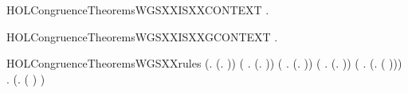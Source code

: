 \newcommand{\HOLCongruenceTheoremsWGSXXind}{\UseVerbatim{HOLCongruenceTheoremsWGSXXind}}
\begin{SaveVerbatim}{HOLCongruenceTheoremsWGSXXISXXCONTEXT}
\HOLTokenTurnstile{} \HOLSymConst{\HOLTokenForall{}}.   \HOLSymConst{\HOLTokenImp{}}  
\end{SaveVerbatim}
\newcommand{\HOLCongruenceTheoremsWGSXXISXXCONTEXT}{\UseVerbatim{HOLCongruenceTheoremsWGSXXISXXCONTEXT}}
\begin{SaveVerbatim}{HOLCongruenceTheoremsWGSXXISXXGCONTEXT}
\HOLTokenTurnstile{} \HOLSymConst{\HOLTokenForall{}}.   \HOLSymConst{\HOLTokenImp{}}  
\end{SaveVerbatim}
\newcommand{\HOLCongruenceTheoremsWGSXXISXXGCONTEXT}{\UseVerbatim{HOLCongruenceTheoremsWGSXXISXXGCONTEXT}}
\begin{SaveVerbatim}{HOLCongruenceTheoremsWGSXXrules}
\HOLTokenTurnstile{} (\HOLSymConst{\HOLTokenForall{}}.  (\HOLTokenLambda{}. )) \HOLSymConst{\HOLTokenConj{}} (\HOLSymConst{\HOLTokenForall{}} .   \HOLSymConst{\HOLTokenImp{}}  (\HOLTokenLambda{}.  )) \HOLSymConst{\HOLTokenConj{}}
   (\HOLSymConst{\HOLTokenForall{}}   .
          \HOLSymConst{\HOLTokenConj{}}   \HOLSymConst{\HOLTokenImp{}}
         (\HOLTokenLambda{}.   \HOLSymConst{+}  )) \HOLSymConst{\HOLTokenConj{}}
   (\HOLSymConst{\HOLTokenForall{}} .   \HOLSymConst{\HOLTokenConj{}}   \HOLSymConst{\HOLTokenImp{}}  (\HOLTokenLambda{}.   \HOLSymConst{\ensuremath{\parallel}}  )) \HOLSymConst{\HOLTokenConj{}}
   (\HOLSymConst{\HOLTokenForall{}} .   \HOLSymConst{\HOLTokenImp{}}  (\HOLTokenLambda{}. \HOLConst{\ensuremath{\nu}}  ( ))) \HOLSymConst{\HOLTokenConj{}}
   \HOLSymConst{\HOLTokenForall{}} .   \HOLSymConst{\HOLTokenImp{}}  (\HOLTokenLambda{}.  ( ) )
\end{SaveVerbatim}
